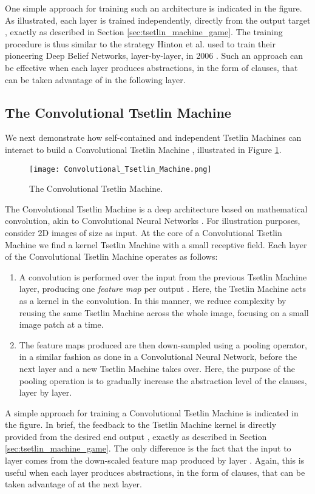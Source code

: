 \documentclass[11pt,a4paper]{article}
\begin{document}
One simple approach for training such an architecture is indicated in the figure. As illustrated, each layer is trained independently, directly from the output target , exactly as described in Section \ref{sec:tsetlin_machine_game}. The training procedure is thus similar to the strategy Hinton et al. used to train their pioneering Deep Belief Networks, layer-by-layer, in 2006 \cite{Hinton2006}. Such an approach can be effective when each layer produces abstractions, in the form of clauses, that can be taken advantage of in the following layer.

\subsection{The Convolutional Tsetlin Machine}

We next demonstrate how self-contained and independent Tsetlin Machines can interact to build a Convolutional Tsetlin Machine \cite{Granmo2018d}, illustrated in Figure \ref{figure:convolutional_tsetlin_machine}.
\begin{figure}[!th]
\centering
\texttt{[image: Convolutional\_Tsetlin\_Machine.png]}
\caption{The Convolutional Tsetlin Machine.}
\label{figure:convolutional_tsetlin_machine}
\end{figure}
The Convolutional Tsetlin Machine is a deep architecture based on mathematical convolution, akin to Convolutional Neural Networks \cite{LeCun1998}. For illustration purposes, consider 2D images of size  as input. At the core of a Convolutional Tsetlin Machine we find a kernel Tsetlin Machine with a small receptive field. Each layer  of the Convolutional Tsetlin Machine operates as follows:
\begin{enumerate}
    \item A convolution is performed over the input from the previous Tsetlin Machine layer, producing one \emph{feature map} per output . Here, the Tsetlin Machine acts as a kernel in the convolution. In this manner, we reduce complexity by reusing the same Tsetlin Machine across the whole image, focusing on a small image patch at a time.  
    \item The feature maps produced are then down-sampled using a pooling operator, in a similar fashion as done in a Convolutional Neural Network,  before the next layer and a new Tsetlin Machine takes over. Here, the purpose of the pooling operation is to gradually increase the abstraction level of the clauses, layer by layer.
\end{enumerate}
A simple approach for training a Convolutional Tsetlin Machine is indicated in the figure. In brief, the feedback to the Tsetlin Machine kernel is directly provided from the desired end output , exactly as described in Section \ref{sec:tsetlin_machine_game}. The only difference is the fact that the input to layer  comes from the down-scaled feature map produced by layer . Again, this is useful when each layer produces abstractions, in the form of clauses, that can be taken advantage of at the next layer.
\end{document}
